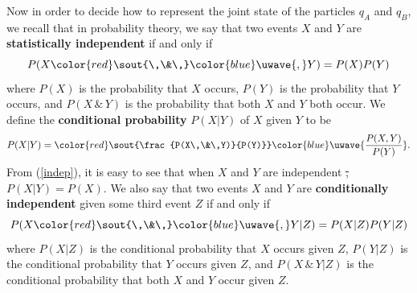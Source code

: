 \documentclass[12pt]{report}
\providecommand{\DIFadd}[1]{{\protect\color{blue}\uwave{#1}}} %
\providecommand{\DIFdel}[1]{{\protect\color{red}\sout{#1}}}                      %
\providecommand{\DIFaddbegin}{} %
\providecommand{\DIFaddend}{} %
\providecommand{\DIFdelbegin}{} %
\providecommand{\DIFdelend}{} %
\begin{document}
Now in order to decide how to represent the joint state of the particles $q_A$ and $q_B$, we recall that  in probability theory, we say that two events $X$ and $Y$ are \textbf{statistically independent} if and only if 
\begin{equation}\label{indep}
    P(X\DIFdelbegin \DIFdel{\,\&\,}\DIFdelend \DIFaddbegin \DIFadd{, }\DIFaddend Y)=P(X)P(Y)
\end{equation}
where $P(X)$ %
%
is the probability that $X$ occurs, $P(Y)$ is the probability that $Y$ occurs, and \DIFdelbegin \DIFdel{$P(X\,\&\,Y)$ }\DIFdelend \DIFaddbegin \DIFadd{$P(X, Y)$ }\DIFaddend is the probability that both $X$ and $Y$ both occur. We define the \textbf{conditional probability} $P(X|Y)$ %
%
of $X$ given $Y$ to be
\begin{equation}\label{conditionaprob}
P(X|Y)= \DIFdelbegin \DIFdel{\frac{P(X\,\&\,Y)}{P(Y)}}\DIFdelend \DIFaddbegin \DIFadd{\frac{P(X, Y)}{P(Y)}}\DIFaddend .
\end{equation}
From (\ref{indep}), it is easy to see that when $X$ and $Y$ are independent \DIFdelbegin \DIFdel{, }\DIFdelend \DIFaddbegin \DIFadd{with $P(Y)\neq 0$, then }\DIFaddend $P(X|Y)=P(X)$. We also say that two events $X$ and $Y$ are \textbf{conditionally independent} given some third event $Z$ if and only if 
\begin{equation}\label{indepcond}
P(X\DIFdelbegin \DIFdel{\,\&\,}\DIFdelend \DIFaddbegin \DIFadd{, }\DIFaddend Y|Z)=P(X|Z)P(Y|Z)
\end{equation} where $P(X|Z)$ is the conditional probability that $X$ occurs given $Z$, $P(Y|Z)$ is the conditional probability that $Y$ occurs given $Z$, and \DIFdelbegin \DIFdel{$P(X\,\&\,Y|Z)$ }\DIFdelend \DIFaddbegin \DIFadd{$P(X, Y|Z)$ }\DIFaddend is the conditional probability that both $X$ and $Y$  occur given $Z$.   
\end{document}
